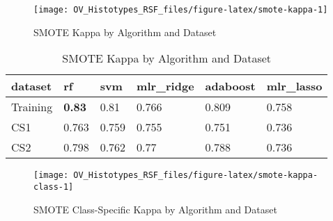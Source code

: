 \documentclass[
]{report}
\begin{document}
\begin{figure}[H]

{\centering \texttt{[image: OV\_Histotypes\_RSF\_files/figure-latex/smote-kappa-1]} 

}

\caption{SMOTE Kappa by Algorithm and Dataset}\label{fig:smote-kappa}
\end{figure}

\begin{table}

\caption{\label{tab:smote-kappa-table}SMOTE Kappa by Algorithm and Dataset}
\centering
\begin{tabular}[t]{l|l|l|l|l|l}
\hline
dataset & rf & svm & mlr\_ridge & adaboost & mlr\_lasso\\
\hline
Training & \textbf{0.83} & 0.81 & 0.766 & 0.809 & 0.758\\
\hline
CS1 & 0.763 & 0.759 & 0.755 & 0.751 & 0.736\\
\hline
CS2 & 0.798 & 0.762 & 0.77 & 0.788 & 0.736\\
\hline
\end{tabular}
\end{table}

\begin{figure}[H]

{\centering \texttt{[image: OV\_Histotypes\_RSF\_files/figure-latex/smote-kappa-class-1]} 

}

\caption{SMOTE Class-Specific Kappa by Algorithm and Dataset}\label{fig:smote-kappa-class}
\end{figure}

  
\end{document}
